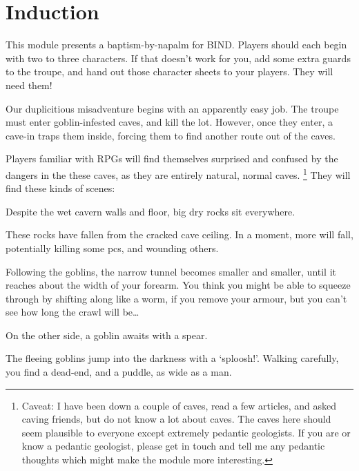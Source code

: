 \section{Induction}
\begin{multicols}{2}

\noindent
This module presents a baptism-by-napalm for BIND.
Players should each begin with two to three characters.
If that doesn't work for you, add some extra \glspl{guard} to the troupe, and hand out those character sheets to your players.
They will need them!

Our duplicitious misadventure begins with an apparently easy job.
The troupe must enter goblin-infested caves, and kill the lot.
However, once they enter, a cave-in traps them inside, forcing them to find another route out of the caves.

Players familiar with RPGs will find themselves surprised and confused by the dangers in the these caves, as they are entirely natural, normal caves.%
\footnote{Caveat: I have been down a couple of caves, read a few articles, and asked caving friends, but do not know a lot about caves.
The caves here should seem plausible to everyone except extremely pedantic geologists.
If you are or know a pedantic geologist, please get in touch and tell me any pedantic thoughts which might make the module more interesting.}
They will find these kinds of scenes:

\begin{boxtext}
  Despite the wet cavern walls and floor, big dry rocks sit everywhere.
\end{boxtext}

\noindent
These rocks have fallen from the cracked cave ceiling.
In a moment, more will fall, potentially killing some \glspl{pc}, and wounding others.

\begin{boxtext}
  Following the goblins, the narrow tunnel becomes smaller and smaller, until it reaches about the width of your forearm.
  You think you might be able to squeeze through by shifting along like a worm, if you remove your armour, but you can't see how long the crawl will be\ldots
\end{boxtext}

\noindent
On the other side, a goblin awaits with a spear.

\begin{boxtext}
  The fleeing goblins jump into the darkness with a `sploosh!'.
  Walking carefully, you find a dead-end, and a puddle, as wide as a man.
\end{boxtext}


\end{multicols}
